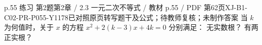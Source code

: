 \par\noindent\begin{minipage}{\linewidth}
\begin{bankitem}{p.55 练习 第2题}{第2章 / 2.3 一元二次不等式 / 教材 p.55 / PDF 第62页}{XJ-B1-C02-PR-P055-Y1178}{已对照原页转写题干及公式；待教师复核；未制作答案}
当 $k$ 为何值时，关于 $x$ 的方程 $x^2+2(k-3)x+4k=0$ 分别满足：
无实数根？
有两正实根？
\end{bankitem}
\end{minipage}\par\medskip
